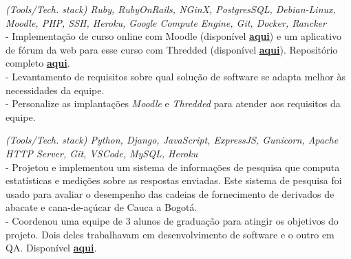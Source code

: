 \documentclass[]{CV-JuanCamiloFlorez}
\begin{document}
\begin{minipage}[t]{0.66\textwidth}
    \focusareas{}
    \textit{(Tools/Tech. stack) Ruby, RubyOnRails, NGinX, PostgresSQL, Debian-Linux, Moodle, PHP, SSH, Heroku, Google Compute Engine, Git, Docker, Rancker} \\
        - Implementação de curso online com Moodle (disponível \textbf{\href{https://gitlab.com/VanJFlorez/animal-modeling-ethics/tree/master/docs/4 LMS build}{aqui}}) e um aplicativo de fórum da web para esse curso com Thredded (disponível \textbf{\href{https://gitlab.com/VanJFlorez/animal-modeling-ethics/blob/master/docs/3\%20Social\%20WebApp/CP\%20etica\%20animal\%20webApp.pdf}{aqui}}). Repositório completo \textbf{\href{https://gitlab.com/VanJFlorez/animal-modeling-ethics/}{aqui}}. \\
        - Levantamento de requisitos sobre qual solução de software se adapta melhor às necessidades da equipe. \\
        - Personalize as implantações \textit{Moodle} e \textit{Thredded} para atender aos requisitos da equipe. \\
        \sectionsep

    \focusareas{}
    \textit{(Tools/Tech. stack) Python, Django, JavaScript, ExpressJS, Gunicorn, Apache HTTP Server, Git, VSCode, MySQL, Heroku} \\
        - Projetou e implementou um sistema de informações de pesquisa que computa estatísticas e medições sobre as respostas enviadas. Este sistema de pesquisa foi usado para avaliar o desempenho das cadeias de fornecimento de derivados de abacate e cana-de-açúcar de Cauca a Bogotá. \\
        - Coordenou uma equipe de 3 alunos de graduação para atingir os objetivos do projeto. Dois deles trabalhavam em desenvolvimento de software e o outro em QA. Disponível \textbf{\href{https://gitlab.com/VanJFlorez/sepro-webapp}{aqui}}. \\
        \sectionsep

 
\vspace{\topsep} %




\end{minipage}
\end{document}
